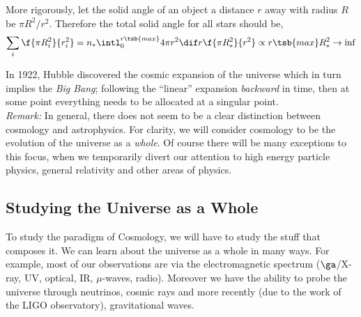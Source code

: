 \documentclass{article}
\begin{document}
More rigorously, let the solid angle of an object a distance $r$ away with radius $R$ be $\pi R^2 / r^2$. Therefore the total solid angle for all stars should be,
\[ \sum_{i} \f{\pi R_{i}^2}{r_{i}^2} = n_* \intl_{0}^{r\tsb{max}} {4 \pi r^2 \dif r \f{\pi R_{*}^2}{r^2}} \propto r\tsb{max} R_{*}^2 \to \inf \]

In 1922, Hubble discovered the cosmic expansion of the universe which in turn implies the \textit{Big Bang}; following the ``linear'' expansion \textit{backward} in time, then at some point everything needs to be allocated at a singular point. \\

\textit{Remark:} In general, there does not seem to be a clear distinction between cosmology and astrophysics. For clarity, we will consider cosmology to be the evolution of the universe as a \textit{whole}. Of course there will be many exceptions to this focus, when we temporarily divert our attention to high energy particle physics, general relativity and other areas of physics. \\

\subsection{Studying the Universe as a Whole}

To study the paradigm of Cosmology, we will have to study the stuff that composes it. We can learn about the universe as a whole in many ways. For example, most of our observations are via the electromagnetic spectrum ($\ga$/X-ray, UV, optical, IR, $\mu$-waves, radio). Moreover we have the ability to probe the universe through neutrinos, cosmic rays and more recently (due to the work of the LIGO observatory), gravitational waves. \\
\end{document}
